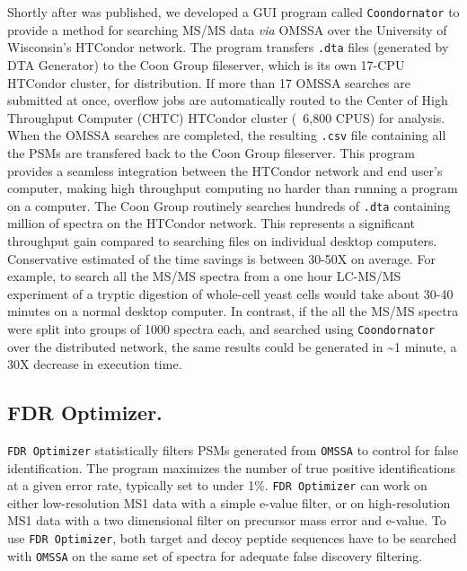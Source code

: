 Shortly after \compass{} was published, we developed a GUI program called \texttt{Coondornator} to provide a method for searching MS/MS data \emph{via} OMSSA over the University of Wisconsin's HTCondor network. The program transfers \texttt{.dta} files (generated by DTA Generator) to the Coon Group fileserver, which is its own 17-CPU HTCondor cluster, for distribution. If more than 17 OMSSA searches are submitted at once, overflow jobs are automatically routed to the Center of High Throughput Computer (CHTC) HTCondor cluster (~6,800 CPUS) for analysis. When the OMSSA searches are completed, the resulting \texttt{.csv} file containing all the PSMs are transfered back to the Coon Group fileserver. This program provides a seamless integration between the HTCondor network and end user's computer, making high throughput computing no harder than running a program on a computer. The Coon Group routinely searches hundreds of \texttt{.dta} containing million of spectra on the HTCondor network. This represents a significant throughput gain compared to searching files on individual desktop computers. Conservative estimated of the time savings is between 30-50X on average. For example, to search all the MS/MS spectra from a one hour LC-MS/MS experiment of a tryptic digestion of whole-cell yeast cells would take about 30-40 minutes on a normal desktop computer. In contrast, if the all the MS/MS spectra were split into groups of 1000 spectra each, and searched using \texttt{Coondornator} over the distributed network, the same results could be generated in \textasciitilde1 minute, a 30X decrease in execution time.

\subsection*{FDR Optimizer.}
\texttt{FDR Optimizer} statistically filters PSMs generated from \texttt{OMSSA} to control for false identification. The program maximizes the number of true positive identifications at a given error rate, typically set to under 1\%. \texttt{FDR Optimizer} can work on either low-resolution MS1 data with a simple e-value filter, or on high-resolution MS1 data with a two dimensional filter on precursor mass error and e-value. To use \texttt{FDR Optimizer}, both target and decoy peptide sequences have to be searched with \texttt{OMSSA} on the same set of spectra for adequate false discovery filtering. 

